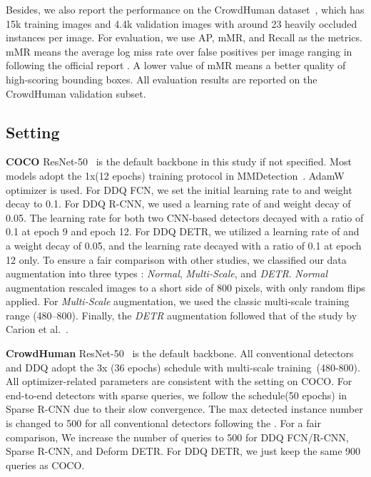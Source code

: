 \documentclass[10pt,twocolumn,letterpaper]{article}
\begin{document}
Besides, we also report the performance on the CrowdHuman dataset~\cite{shao2018crowdhuman}, which has 15k training images and 4.4k validation images with around 23 heavily occluded instances per image. For evaluation, we use AP, mMR, and Recall as the metrics. mMR means the average log miss rate over false positives per image ranging in  following the official report \cite{shao2018crowdhuman}. A lower value of mMR means a better quality of high-scoring bounding boxes. All evaluation results are reported on the CrowdHuman validation subset. 

\subsection{Setting}
\noindent\textbf{COCO} ResNet-50~\cite{he2016deep} is the default backbone in this study if not specified. Most models adopt the 1x(12 epochs) training protocol in MMDetection~\cite{chen2019mmdetection}. AdamW~\cite{loshchilov2018decoupled} optimizer is used. For DDQ FCN, we set the initial learning rate to \textbf{} and weight decay to 0.1. For DDQ R-CNN, we used a learning rate of \textbf{} and weight decay of 0.05. The learning rate for both two CNN-based detectors decayed with a ratio of 0.1 at epoch 9 and epoch 12. For DDQ DETR, we utilized a learning rate of \textbf{} and a weight decay of 0.05, and the learning rate decayed with a ratio of 0.1 at epoch 12 only. To ensure a fair comparison with other studies, we classified our data augmentation into three types \label{link:aug}: \emph{Normal}, \emph{Multi-Scale}, and \emph{DETR}. \emph{Normal} augmentation rescaled images to a short side of 800 pixels, with only random flips applied. For \emph{Multi-Scale} augmentation, we used the classic multi-scale training range (480--800). Finally, the \emph{DETR} augmentation followed that of the study by Carion et al.~\cite{carion2020end}. 

\noindent\textbf{CrowdHuman} ResNet-50~\cite{he2016deep} is the default backbone. All conventional detectors and DDQ  adopt the 3x (36 epochs) schedule with multi-scale training~(480-800). All optimizer-related parameters are consistent with the setting on COCO. For end-to-end detectors with sparse queries, we follow the schedule(50 epochs) in Sparse R-CNN due to their slow convergence. The max detected instance number is changed to 500 for all conventional detectors following the \cite{wang2021end}. For a fair comparison, We increase the number of queries to 500 for DDQ FCN/R-CNN, Sparse R-CNN, and Deform DETR. For DDQ DETR, we just keep the same 900 queries as COCO.
\end{document}
